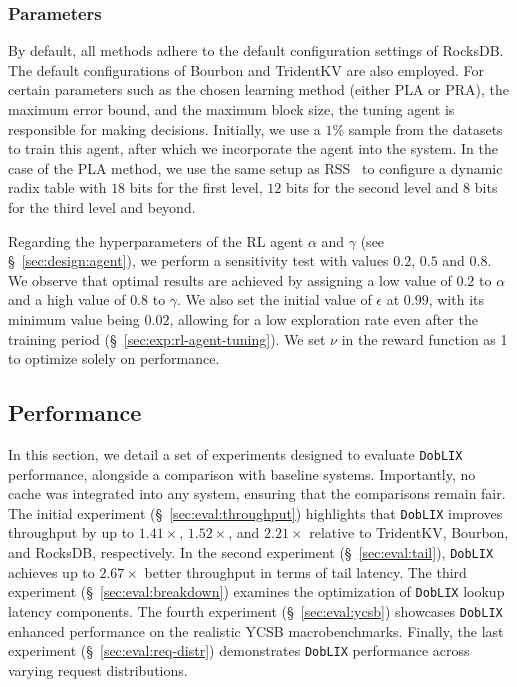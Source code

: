 \vspace{1pt}
\noindent
\subsubsection{\textbf{Parameters}}
\label{sec:parameters}
By default, all methods adhere to the default configuration settings of RocksDB. The default configurations of Bourbon and TridentKV are also employed.
For certain parameters such as the chosen learning method (either PLA or PRA), the maximum error bound, and the maximum block size, the tuning agent is responsible for making decisions. Initially, we use a $1\%$ sample from the datasets to train this agent, after which we incorporate the agent into the system. In the case of the PLA method, we use the same setup as RSS~\cite{rss} to configure a dynamic radix table with $18$ bits for the first level, $12$ bits for the second level and $8$ bits for the third level and beyond. 

Regarding the hyperparameters of the RL agent $\alpha$ and $\gamma$ (see \S~\ref{sec:design:agent}), we perform a sensitivity test with values $0.2$, $0.5$ and $0.8$. We observe that optimal results are achieved by assigning a low value of $0.2$ to $\alpha$ and a high value of $0.8$ to $\gamma$. We also set the initial value of $\epsilon$ at $0.99$, with its minimum value being $0.02$, allowing for a low exploration rate even after the training period (\S~\ref{sec:exp:rl-agent-tuning}). We set $\nu$ in the reward function as 1 to optimize solely on performance.


\subsection{Performance}
\label{sec:eval:perf}
In this section, we detail a set of experiments designed to evaluate \texttt{DobLIX} performance, alongside a comparison with baseline systems. Importantly, no cache was integrated into any system, ensuring that the comparisons remain fair.
The initial experiment (\S~\ref{sec:eval:throughput}) highlights that \texttt{DobLIX} improves throughput by up to $1.41\times$, $1.52\times$, and $2.21\times$ relative to TridentKV, Bourbon, and RocksDB, respectively.
In the second experiment (\S~\ref{sec:eval:tail}), \texttt{DobLIX} achieves up to $2.67\times$ better throughput in terms of tail latency.
The third experiment (\S~\ref{sec:eval:breakdown}) examines the optimization of \texttt{DobLIX} lookup latency components.
The fourth experiment (\S~\ref{sec:eval:ycsb}) showcases \texttt{DobLIX} enhanced performance on the realistic YCSB macrobenchmarks.
Finally, the last experiment (\S~\ref{sec:eval:req-distr}) demonstrates \texttt{DobLIX} performance across varying request distributions. 

